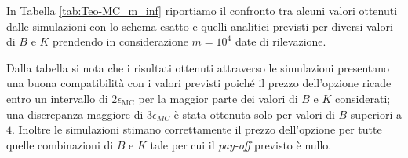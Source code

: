In Tabella \ref{tab:Teo-MC_m_inf} riportiamo il confronto tra alcuni valori ottenuti dalle simulazioni con lo schema esatto e quelli analitici previsti per diversi valori di $B$ e $K$ prendendo in considerazione $m=10^4$ date di rilevazione.

Dalla tabella si nota che i risultati ottenuti attraverso le simulazioni presentano una buona compatibilità con i valori previsti poiché il prezzo dell'opzione ricade entro un intervallo di $2\epsilon_\text{MC}$ per la maggior parte dei valori di $B$ e $K$ considerati; una discrepanza maggiore di $3\epsilon_{MC}$ è stata ottenuta solo per valori di $B$ superiori a $4$. Inoltre le simulazioni stimano correttamente il prezzo dell'opzione per tutte quelle combinazioni di $B$ e $K$ tale per cui il \textit{pay-off} previsto è nullo.